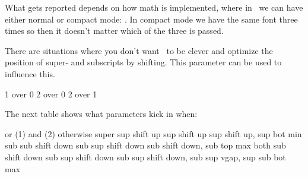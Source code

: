 What gets reported depends on how math is implemented, where in \CONTEXT\ we can
have either normal or compact mode: \inlinebuffer. In compact mode we have the
same font three times so then it doesn't matter which of the three is passed.

\stopnewprimitive

\startnewprimitive[title={\prm {mathscriptsmode}}]

There are situations where you don't want \TEX\ to be clever and optimize the
position of super- and subscripts by shifting. This parameter can be used to
influence this.

\startlinecorrection
{} {}
  {\startoverlay
     {}
     {}
   \stopoverlay} {}
  {\startoverlay
     {}
     {}
   \stopoverlay} {}
  {\startoverlay
     {}
     {}
   \stopoverlay} {1 over 0}
  {\startoverlay
     {}
     {}
   \stopoverlay} {2 over 0}
  {\startoverlay
     {}
     {}
   \stopoverlay} {2 over 1}
\stopcombination
\stoplinecorrection

The next table shows what parameters kick in when:

\starttabulate[|l|l|l|p|]
\NC       \BC or (1)         \BC and (2)            \BC otherwise       \NC \NR
\BC super \NC sup shift up   \NC sup shift up       \NC sup shift up,
                                                        sup bot min     \NC \NR
\BC sub   \NC sub shift down \NC sub sup shift down \NC sub shift down,
                                                        sub top max     \NC \NR
\BC both  \NC sub shift down \NC sub sup shift down \NC sub sup shift down,
                                                        sub sup vgap,
                                                        sup sub bot max \NC \NR
\stoptabulate

